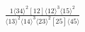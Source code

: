 \documentclass[varwidth, border=5pt]{standalone}
\begin{document}
\begin{my}
$\begin{gathered}
\scriptscriptstyle\frac{1⟨34⟩^2[12]⟨12⟩^3⟨15⟩^2}{⟨13⟩^2⟨14⟩^3⟨23⟩^2[25]⟨45⟩}
\end{gathered}$
\end{my}
\end{document}
